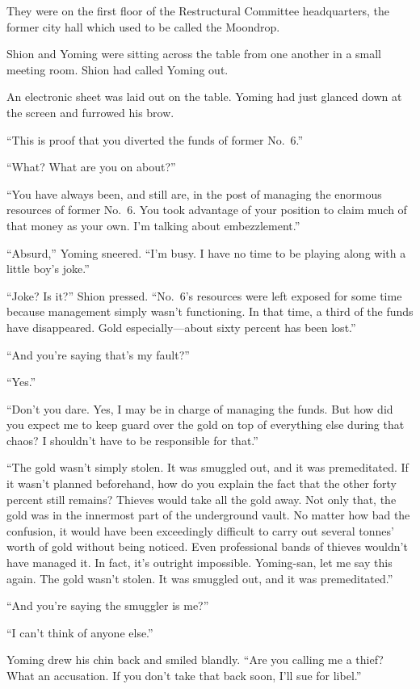 They were on the first floor of the Restructural Committee headquarters,
the former city hall which used to be called the Moondrop.

Shion and Yoming were sitting across the table from one another in a
small meeting room. Shion had called Yoming out.

An electronic sheet was laid out on the table. Yoming had just glanced
down at the screen and furrowed his brow.

``This is proof that you diverted the funds of former No.~6.''

``What? What are you on about?''

``You have always been, and still are, in the post of managing the
enormous resources of former No.~6. You took advantage of your position
to claim much of that money as your own. I'm talking about
embezzlement.''

``Absurd,'' Yoming sneered. ``I'm busy. I have no time to be playing
along with a little boy's joke.''

``Joke? Is it?'' Shion pressed. ``No.~6's resources were left exposed
for some time because management simply wasn't functioning. In that
time, a third of the funds have disappeared. Gold especially---about sixty
percent has been lost.''

``And you're saying that's my fault?''

``Yes.''

``Don't you dare. Yes, I may be in charge of managing the funds. But how
did you expect me to keep guard over the gold on top of everything else
during that chaos? I shouldn't have to be responsible for that.''

``The gold wasn't simply stolen. It was smuggled out, and it was
premeditated. If it wasn't planned beforehand, how do you explain the
fact that the other forty percent still remains? Thieves would take all
the gold away. Not only that, the gold was in the innermost part of the
underground vault. No matter how bad the confusion, it would have been
exceedingly difficult to carry out several tonnes' worth of gold without
being noticed. Even professional bands of thieves wouldn't have managed
it. In fact, it's outright impossible. Yoming-san, let me say this
again. The gold wasn't stolen. It was smuggled out, and it was
premeditated.''

``And you're saying the smuggler is me?''

``I can't think of anyone else.''

Yoming drew his chin back and smiled blandly. ``Are you calling me a
thief? What an accusation. If you don't take that back soon, I'll sue
for libel.''


